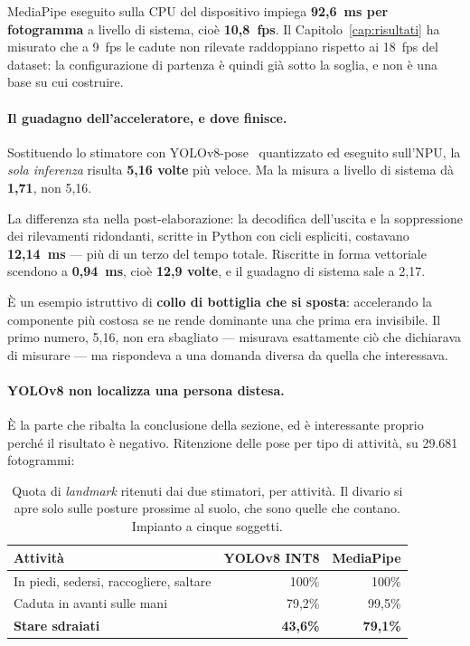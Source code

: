 MediaPipe eseguito sulla CPU del dispositivo impiega \textbf{92,6~ms per fotogramma} a livello di sistema, cioè \textbf{10,8~fps}. Il Capitolo~\ref{cap:risultati} ha misurato che a 9~fps le cadute non rilevate raddoppiano rispetto ai 18~fps del dataset: la configurazione di partenza è quindi già sotto la soglia, e non è una base su cui costruire.

\paragraph{Il guadagno dell'acceleratore, e dove finisce.}

Sostituendo lo stimatore con YOLOv8-pose~\cite{yolopose} quantizzato ed eseguito sull'NPU, la \emph{sola inferenza} risulta \textbf{5,16 volte} più veloce. Ma la misura a livello di sistema dà \textbf{1,71}, non 5,16.

La differenza sta nella post-elaborazione: la decodifica dell'uscita e la soppressione dei rilevamenti ridondanti, scritte in Python con cicli espliciti, costavano \textbf{12,14~ms} --- più di un terzo del tempo totale. Riscritte in forma vettoriale scendono a \textbf{0,94~ms}, cioè \textbf{12,9 volte}, e il guadagno di sistema sale a 2,17.

È un esempio istruttivo di \textbf{collo di bottiglia che si sposta}: accelerando la componente più costosa se ne rende dominante una che prima era invisibile. Il primo numero, 5,16, non era sbagliato --- misurava esattamente ciò che dichiarava di misurare --- ma rispondeva a una domanda diversa da quella che interessava.

\paragraph{YOLOv8 non localizza una persona distesa.} È la parte che ribalta la conclusione della sezione, ed è interessante proprio perché il risultato è negativo. Ritenzione delle pose per tipo di attività, su 29.681 fotogrammi:

\begin{table}[ht]
\centering
\caption{Quota di \emph{landmark} ritenuti dai due stimatori, per attività. Il
divario si apre solo sulle posture prossime al suolo, che sono quelle che
contano. Impianto a cinque soggetti.}
\label{tab:ritenzione}
\begin{tabular}{lrr}
\toprule
Attività & YOLOv8 INT8 & MediaPipe \\
\midrule
In piedi, sedersi, raccogliere, saltare & 100\% & 100\% \\
Caduta in avanti sulle mani & 79,2\% & 99,5\% \\
\textbf{Stare sdraiati} & \textbf{43,6\%} & \textbf{79,1\%} \\
\bottomrule
\end{tabular}
\end{table}

